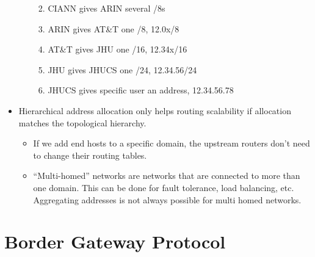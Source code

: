 \begin{itemize}
\begin{itemize}
    \begin{enumerate}
    \def\labelenumi{\arabic{enumi}.}
    \tightlist
    \item
      CIANN gives ARIN several /8s
    \item
      ARIN gives AT\&T one /8, 12.0x/8
    \item
      AT\&T gives JHU one /16, 12.34x/16
    \item
      JHU gives JHUCS one /24, 12.34.56/24
    \item
      JHUCS gives specific user an address, 12.34.56.78
    \end{enumerate}
  \end{itemize}
\item
  Hierarchical address allocation only helps routing scalability if
  allocation matches the topological hierarchy.

  \begin{itemize}
  \tightlist
  \item
    If we add end hosts to a specific domain, the upstream routers don't
    need to change their routing tables.
  \item
    ``Multi-homed'' networks are networks that are connected to more
    than one domain. This can be done for fault tolerance, load
    balancing, etc. Aggregating addresses is not always possible for
    multi homed networks.
  \end{itemize}
\end{itemize}

\hypertarget{border-gateway-protocol}{%
\section{Border Gateway Protocol}\label{border-gateway-protocol}}

